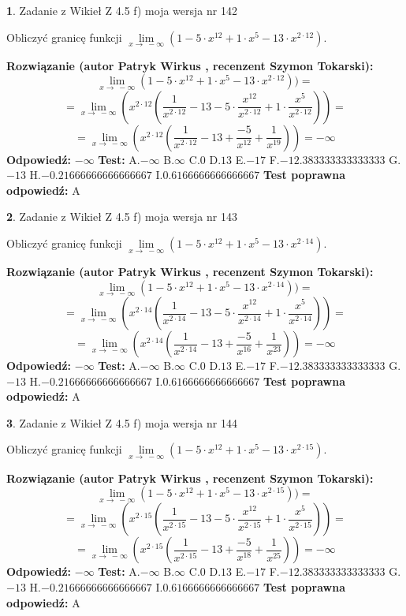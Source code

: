 \documentclass[12pt, a4paper]{article}
\theoremstyle{definition} %
\newtheorem{zad}{}
\newcommand{\zadStart}[1]{\begin{zad}#1\newline}
\newcommand{\zadStop}{\end{zad}}
\newcommand{\rozwStart}[2]{\noindent \textbf{Rozwiązanie (autor #1 , recenzent #2): }\newline}
\newcommand{\rozwStop}{\newline}
\newcommand{\odpStart}{\noindent \textbf{Odpowiedź:}\newline}
\newcommand{\odpStop}{\newline}
\newcommand{\testStart}{\noindent \textbf{Test:}\newline}
\newcommand{\testStop}{\newline}
\newcommand{\kluczStart}{\noindent \textbf{Test poprawna odpowiedź:}\newline}
\newcommand{\kluczStop}{\newline}
\begin{document}
\zadStart{Zadanie z Wikieł Z 4.5 f) moja wersja nr 142}


Obliczyć granicę funkcji  $\lim\limits_{x\to\ -\infty}(1 - 5 \cdot x^{12}+1 \cdot x^{5}- 13 \cdot x^{2\cdot12})$.
\zadStop
\rozwStart{Patryk Wirkus}{Szymon Tokarski}
$$\lim\limits_{x\to\ -\infty}(1 - 5 \cdot x^{12}+1 \cdot x^{5}- 13 \cdot x^{2\cdot12}))=$$
$$=\lim\limits_{x\to\ -\infty}(x^{2\cdot12}(\frac{1}{x^{2\cdot12}}-13 -5 \cdot \frac{x^{12}}{x^{2\cdot12}}+1 \cdot \frac{x^{5}}{x^{2\cdot12}}))=$$
$$=\lim\limits_{x\to\ -\infty}(x^{2\cdot12}(\frac{1}{x^{2\cdot12}}-13 + \frac{-5}{x^{12}}+ \frac{1}{x^{19}}))=-\infty$$
\rozwStop
\odpStart
$-\infty$
\odpStop
\testStart
A.$-\infty$ B.$\infty$ C.$0$ D.$13$ E.$-17$
F.$-12.383333333333333$ G.$-13$
H.$-0.21666666666666667$
I.$0.6166666666666667$
\testStop
\kluczStart
A
\kluczStop



\zadStart{Zadanie z Wikieł Z 4.5 f) moja wersja nr 143}


Obliczyć granicę funkcji  $\lim\limits_{x\to\ -\infty}(1 - 5 \cdot x^{12}+1 \cdot x^{5}- 13 \cdot x^{2\cdot14})$.
\zadStop
\rozwStart{Patryk Wirkus}{Szymon Tokarski}
$$\lim\limits_{x\to\ -\infty}(1 - 5 \cdot x^{12}+1 \cdot x^{5}- 13 \cdot x^{2\cdot14}))=$$
$$=\lim\limits_{x\to\ -\infty}(x^{2\cdot14}(\frac{1}{x^{2\cdot14}}-13 -5 \cdot \frac{x^{12}}{x^{2\cdot14}}+1 \cdot \frac{x^{5}}{x^{2\cdot14}}))=$$
$$=\lim\limits_{x\to\ -\infty}(x^{2\cdot14}(\frac{1}{x^{2\cdot14}}-13 + \frac{-5}{x^{16}}+ \frac{1}{x^{23}}))=-\infty$$
\rozwStop
\odpStart
$-\infty$
\odpStop
\testStart
A.$-\infty$ B.$\infty$ C.$0$ D.$13$ E.$-17$
F.$-12.383333333333333$ G.$-13$
H.$-0.21666666666666667$
I.$0.6166666666666667$
\testStop
\kluczStart
A
\kluczStop



\zadStart{Zadanie z Wikieł Z 4.5 f) moja wersja nr 144}


Obliczyć granicę funkcji  $\lim\limits_{x\to\ -\infty}(1 - 5 \cdot x^{12}+1 \cdot x^{5}- 13 \cdot x^{2\cdot15})$.
\zadStop
\rozwStart{Patryk Wirkus}{Szymon Tokarski}
$$\lim\limits_{x\to\ -\infty}(1 - 5 \cdot x^{12}+1 \cdot x^{5}- 13 \cdot x^{2\cdot15}))=$$
$$=\lim\limits_{x\to\ -\infty}(x^{2\cdot15}(\frac{1}{x^{2\cdot15}}-13 -5 \cdot \frac{x^{12}}{x^{2\cdot15}}+1 \cdot \frac{x^{5}}{x^{2\cdot15}}))=$$
$$=\lim\limits_{x\to\ -\infty}(x^{2\cdot15}(\frac{1}{x^{2\cdot15}}-13 + \frac{-5}{x^{18}}+ \frac{1}{x^{25}}))=-\infty$$
\rozwStop
\odpStart
$-\infty$
\odpStop
\testStart
A.$-\infty$ B.$\infty$ C.$0$ D.$13$ E.$-17$
F.$-12.383333333333333$ G.$-13$
H.$-0.21666666666666667$
I.$0.6166666666666667$
\testStop
\kluczStart
A
\kluczStop
\end{document}
